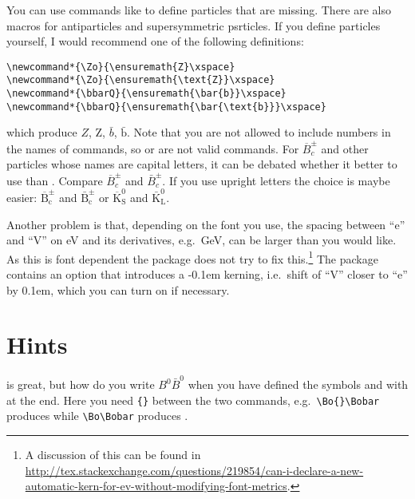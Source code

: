 You can use commands like  to define particles that are missing.
There are also macros for antiparticles and supersymmetric psrticles.
If you define particles yourself,
I would recommend one of the following definitions:
\begin{verbatim}
\newcommand*{\Zo}{\ensuremath{Z}\xspace}
\newcommand*{\Zo}{\ensuremath{\text{Z}}\xspace}
\newcommand*{\bbarQ}{\ensuremath{\bar{b}}\xspace}
\newcommand*{\bbarQ}{\ensuremath{\bar{\text{b}}}\xspace}
\end{verbatim}
which produce \ensuremath{Z}, \ensuremath{\text{Z}},
\ensuremath{\bar{b}}, \ensuremath{\bar{\text{b}}}. Note that you are
not allowed to include numbers in the names of commands, so
 or  are not valid commands. For
$\overline{B}^{\pm}_{c}$ and other particles whose names are capital
letters, it can be debated whether it better to use
 than
. Compare $\overline{B}^{\pm}_{c}$ and
$\bar{B}^{\pm}_{c}$. If you use upright letters the choice is maybe
easier: $\overline{\text{B}}^{\pm}_{\text{c}}$ and
$\bar{\text{B}}^{\pm}_{\text{c}}$ or
$\overline{\text{K}}^{0}_{\text{S}}$ and
$\bar{\text{K}}^{0}_{\text{L}}$.

Another problem is that, depending on the font you use, the spacing between \enquote{e} and \enquote{V}
on \si{\eV} and its derivatives, e.g.\ \si{\GeV}, can be larger than you would like.
As this is font dependent the  package does not try to fix this.\footnote{%
A discussion of this can be found in
\url{http://tex.stackexchange.com/questions/219854/can-i-declare-a-new-automatic-kern-for-ev-without-modifying-font-metrics}.}
The  package contains an option  that introduces a -0.1em kerning,
i.e.\ shift of \enquote{V} closer to \enquote{e} by 0.1em, which you can turn on if necessary.


\section{Hints}
\label{sec:tips:hints}

 is great, but how do you write $B^{0}\bar{B}^{0}$ when
you have defined the symbols  and  with
 at the end. Here you need \verb+{}+ between the two
commands, e.g.\ \verb+\Bo{}\Bobar+ produces \Bo{}\Bobar while
\verb+\Bo\Bobar+ produces \Bo\Bobar.

